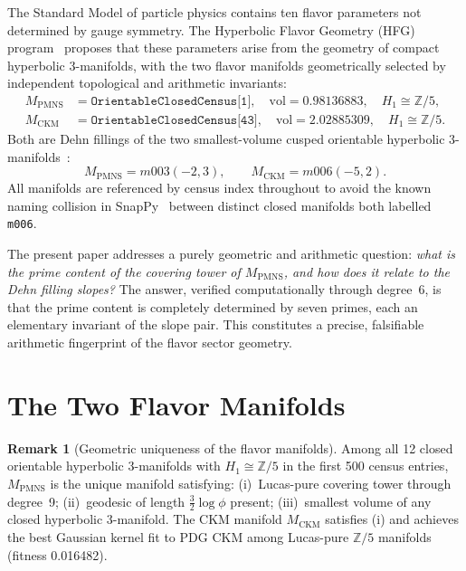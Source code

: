 \documentclass[12pt]{article}
\theoremstyle{definition}
\newtheorem{remark}[theorem]{Remark}
\begin{document}
The Standard Model of particle physics contains ten flavor parameters
not determined by gauge symmetry. The Hyperbolic Flavor Geometry (HFG)
program~\cite{Gentry:CKM,Gentry:PMNS,Gentry:CP,Gentry:Twist} proposes
that these parameters arise from the geometry of compact hyperbolic
3-manifolds, with the two flavor manifolds geometrically selected by independent topological and arithmetic invariants:
\begin{align*}
  M_{\mathrm{PMNS}} &= \texttt{OrientableClosedCensus[1]},\quad
    \mathrm{vol} = 0.98136883,\quad H_1 \cong \mathbb{Z}/5, \\
  M_{\mathrm{CKM}}  &= \texttt{OrientableClosedCensus[43]},\quad
    \mathrm{vol} = 2.02885309,\quad H_1 \cong \mathbb{Z}/5.
\end{align*}
Both are Dehn fillings of the two smallest-volume cusped orientable
hyperbolic 3-manifolds~\cite{Thurston}:
\[
  M_{\mathrm{PMNS}} = m003(-2,3), \qquad M_{\mathrm{CKM}} = m006(-5,2).
\]
All manifolds are referenced by census index throughout to avoid the
known naming collision in SnapPy~\cite{SnapPy} between distinct closed
manifolds both labelled \texttt{m006}.

The present paper addresses a purely geometric and arithmetic question:
\emph{what is the prime content of the covering tower of
$M_{\mathrm{PMNS}}$, and how does it relate to the Dehn filling slopes?}
The answer, verified computationally through degree~6, is that the prime
content is completely determined by seven primes, each an elementary
invariant of the slope pair. This constitutes a precise, falsifiable
arithmetic fingerprint of the flavor sector geometry.

\section{The Two Flavor Manifolds}
\begin{remark}[Geometric uniqueness of the flavor manifolds]
Among all 12 closed orientable hyperbolic 3-manifolds with
$H_1 \cong \mathbb{Z}/5$ in the first 500 census entries,
$M_{\mathrm{PMNS}}$ is the unique manifold satisfying:
(i)~Lucas-pure covering tower through degree~9;
(ii)~geodesic of length $\tfrac{3}{2}\log\phi$ present;
(iii)~smallest volume of any closed hyperbolic 3-manifold.
The CKM manifold $M_{\mathrm{CKM}}$ satisfies (i) and achieves
the best Gaussian kernel fit to PDG CKM among Lucas-pure $\mathbb{Z}/5$
manifolds (fitness 0.016482).
\end{remark}
\end{document}
